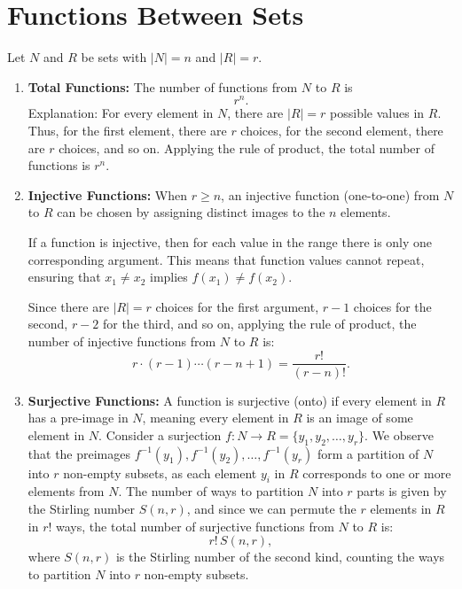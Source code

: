 \documentclass{article}
\begin{document}
\section{Functions Between Sets}

Let $N$ and $R$ be sets with $|N| = n$ and $|R| = r$.

\begin{enumerate}[label=(\roman*)]
    \item \textbf{Total Functions:}  
    The number of functions from \( N \) to \( R \) is  
    \[
    r^n.
    \]  
    Explanation: For every element in \( N \), there are \( |R| = r \) possible values in \( R \). Thus, for the first element, there are \( r \) choices, for the second element, there are \( r \) choices, and so on.  
    Applying the rule of product, the total number of functions is \( r^n \).

    \item \textbf{Injective Functions:}  
    When \( r \geq n \), an injective function (one-to-one) from \( N \) to \( R \) can be chosen by assigning distinct images to the \( n \) elements.  

    If a function is injective, then for each value in the range there is only one corresponding argument. This means that function values cannot repeat, ensuring that \( x_1 \neq x_2 \) implies \( f(x_1) \neq f(x_2) \).  

    Since there are \( |R| = r \) choices for the first argument, \( r-1 \) choices for the second, \( r-2 \) for the third, and so on, applying the rule of product, the number of injective functions from \( N \) to \( R \) is:  
    \[
    r \cdot (r-1) \cdots (r-n+1) = \frac{r!}{(r-n)!}.
    \]
    \item \textbf{Surjective Functions:}  
    A function is surjective (onto) if every element in \( R \) has a pre-image in \( N \), meaning every element in \( R \) is an image of some element in \( N \).  
    Consider a surjection \( f: N \to R = \{y_1, y_2, \dots, y_r\} \). We observe that the preimages \( f^{-1}(y_1), f^{-1}(y_2), \dots, f^{-1}(y_r) \) form a partition of \( N \) into \( r \) non-empty subsets, as each element \( y_i \) in \( R \) corresponds to one or more elements from \( N \).  
    The number of ways to partition \( N \) into \( r \) parts is given by the Stirling number \( S(n, r) \), and since we can permute the \( r \) elements in \( R \) in \( r! \) ways, the total number of surjective functions from \( N \) to \( R \) is:  
    \[
    r! \, S(n, r),
    \]
    where \( S(n, r) \) is the Stirling number of the second kind, counting the ways to partition \( N \) into \( r \) non-empty subsets.

\end{enumerate}
\end{document}
